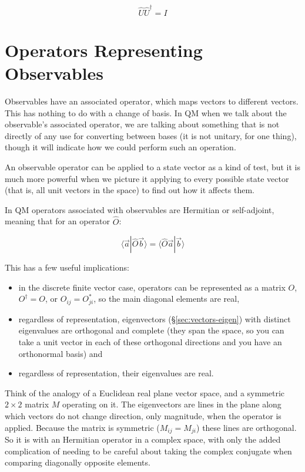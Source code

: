 $$\hat{U} \hat{U}^\dagger = I$$

\section{Operators Representing Observables} \label{sec:qm-operators1}

Observables have an associated operator, which maps vectors to different vectors. This has nothing to do with a change of basis. In QM when we talk about the observable's associated operator, we are talking about something that is not directly of any use for converting between bases (it is not unitary, for one thing), though it will indicate how we could perform such an operation.

An observable operator can be applied to a state vector as a kind of test, but it is much more powerful when we picture it applying to every possible state vector (that is, all unit vectors in the space) to find out how it affects them.

In QM operators associated with observables are Hermitian or self-adjoint, meaning that for an operator $\hat{O}$:

$$\langle \vec{a}|\hat{O} \vec{b} \rangle = \langle \hat{O} \vec{a}| \vec{b} \rangle$$

This has a few useful implications:

\begin{itemize}
  \item in the discrete finite vector case, operators can be represented as a matrix $O$, $O^{\dagger} = O$, or $O_{ij} = O_{ji}^*$, so the main diagonal elements are real,
  \item regardless of representation, eigenvectors (§\ref{sec:vectors-eigen}) with distinct eigenvalues are orthogonal and complete (they span the space, so you can take a unit vector in each of these orthogonal directions and you have an orthonormal basis) and
  \item regardless of representation, their eigenvalues are real.
\end{itemize}

Think of the analogy of a Euclidean real plane vector space, and a symmetric $2 \times 2$ matrix $M$ operating on it. The eigenvectors are lines in the plane along which vectors do not change direction, only magnitude, when the operator is applied. Because the matrix is symmetric ($M_{ij} = M_{ji}$) these lines are orthogonal. So it is with an Hermitian operator in a complex space, with only the added complication of needing to be careful about taking the complex conjugate when comparing diagonally opposite elements.

